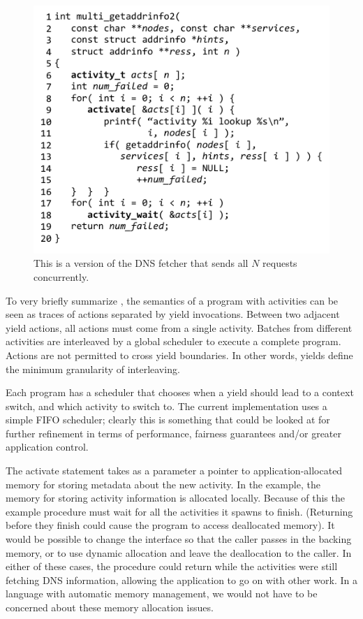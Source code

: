 \documentclass[preprint, 10pt, numbers]{sigplanconf}
\begin{document}
\begin{figure}
\includegraphics{multi_getaddrinfo_conc}
\caption{This is a \charcoal{} version of the DNS fetcher that sends all $N$ requests concurrently.}
\label{fig:charcoal_multidns_conc}
\end{figure}

To very briefly summarize \cite{Abadi2009}, the semantics of a program with activities can be seen as traces of actions separated by yield invocations.
Between two adjacent yield actions, all actions must come from a single activity.
Batches from different activities are interleaved by a global scheduler to execute a complete program.
Actions are not permitted to cross yield boundaries.
In other words, yields define the minimum granularity of interleaving.

Each \charcoal{} program has a scheduler that chooses when a yield should lead to a context switch, and which activity to switch to.
The current \charcoal{} implementation uses a simple FIFO scheduler; clearly this is something that could be looked at for further refinement in terms of performance, fairness guarantees and/or greater application control.

The activate statement takes as a parameter a pointer to application-allocated memory for storing metadata about the new activity.
In the example, the memory for storing activity information is allocated locally.
Because of this the example procedure must wait for all the activities it spawns to finish.
(Returning before they finish could cause the program to access deallocated memory).
It would be possible to change the interface so that the caller passes in the backing memory, or to use dynamic allocation and leave the deallocation to the caller.
In either of these cases, the procedure could return while the activities were still fetching DNS information, allowing the application to go on with other work.
In a language with automatic memory management, we would not have to be concerned about these memory allocation issues.
\end{document}
